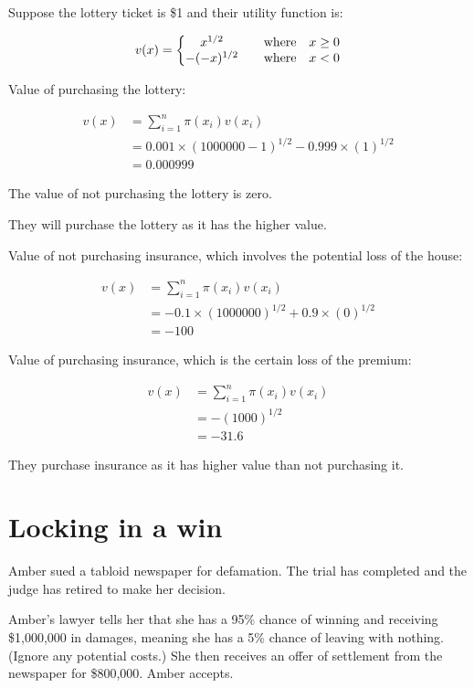 \documentclass[
  letterpaper,
  DIV=11,
  numbers=noendperiod]{scrreprt}
\begin{document}
\begin{tcolorbox}
Suppose the lottery ticket is \$1 and their utility function is:

\[
v(x)=\left\{\begin{matrix}
x^{1/2} \quad &\textrm{where} \space &x \geq 0\\
-(-x)^{1/2} \quad &\textrm{where} \space &x < 0
\end{matrix}\right.
\]

Value of purchasing the lottery:

\begin{align*}
v(x)&=\sum_{i=1}^{n} \pi(x_i)v(x_i) \\[6pt]
&=0.001\times (1000000-1)^{1/2}-0.999\times (1)^{1/2} \\[6pt]
&=0.000999
\end{align*}

The value of not purchasing the lottery is zero.

They will purchase the lottery as it has the higher value.

Value of not purchasing insurance, which involves the potential loss of
the house:

\begin{align*}
v(x)&=\sum_{i=1}^{n} \pi(x_i)v(x_i) \\[6pt]
&=-0.1\times (1000000)^{1/2}+0.9\times (0)^{1/2} \\[6pt]
&=-100
\end{align*}

Value of purchasing insurance, which is the certain loss of the premium:

\begin{align*}
v(x)&=\sum_{i=1}^{n} \pi(x_i)v(x_i) \\[6pt]
&=-(1000)^{1/2} \\[6pt]
&=-31.6
\end{align*}

They purchase insurance as it has higher value than not purchasing it.

\end{tcolorbox}

\hypertarget{locking-in-a-win}{%
\section{Locking in a win}\label{locking-in-a-win}}

Amber sued a tabloid newspaper for defamation. The trial has completed
and the judge has retired to make her decision.

Amber's lawyer tells her that she has a 95\% chance of winning and
receiving \$1,000,000 in damages, meaning she has a 5\% chance of
leaving with nothing. (Ignore any potential costs.) She then receives an
offer of settlement from the newspaper for \$800,000. Amber accepts.
\end{document}
